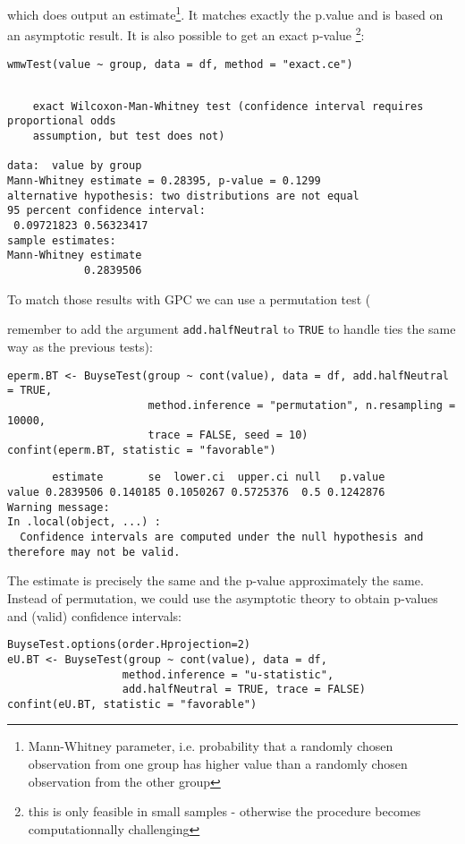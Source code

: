 \documentclass[12pt]{article}
\newcommand\Warning[1][3ex]{%
\renewcommand\stacktype{L}%
\scaleto{\stackon[1.3pt]{\color{red}$\triangle$}{\tiny\bfseries !}}{#1}%
\xspace
}
\begin{document}
which does output an estimate\footnote{Mann-Whitney parameter,
i.e. probability that a randomly chosen observation from one group has
higher value than a randomly chosen observation from the other
group}. It matches exactly the p.value and is based on an asymptotic
result. It is also possible to get an exact p-value \footnote{this is only
feasible in small samples - otherwise the procedure becomes
computationnally challenging}:
\lstset{language=r,label= ,caption= ,captionpos=b,numbers=none}
\begin{lstlisting}
wmwTest(value ~ group, data = df, method = "exact.ce")
\end{lstlisting}

\begin{verbatim}

	exact Wilcoxon-Man-Whitney test (confidence interval requires proportional odds
	assumption, but test does not)

data:  value by group
Mann-Whitney estimate = 0.28395, p-value = 0.1299
alternative hypothesis: two distributions are not equal
95 percent confidence interval:
 0.09721823 0.56323417
sample estimates:
Mann-Whitney estimate 
            0.2839506
\end{verbatim}

To match those results with GPC we can use a permutation test
(\Warning remember to add the argument \texttt{add.halfNeutral} to \texttt{TRUE} to
handle ties the same way as the previous tests):
\lstset{language=r,label= ,caption= ,captionpos=b,numbers=none}
\begin{lstlisting}
eperm.BT <- BuyseTest(group ~ cont(value), data = df, add.halfNeutral = TRUE,
                      method.inference = "permutation", n.resampling = 10000,
                      trace = FALSE, seed = 10)
confint(eperm.BT, statistic = "favorable")
\end{lstlisting}

\begin{verbatim}
       estimate       se  lower.ci  upper.ci null   p.value
value 0.2839506 0.140185 0.1050267 0.5725376  0.5 0.1242876
Warning message:
In .local(object, ...) :
  Confidence intervals are computed under the null hypothesis and therefore may not be valid.
\end{verbatim}


The estimate is precisely the same and the p-value approximately the
same. Instead of permutation, we could use the asymptotic theory to
obtain p-values and (valid) confidence intervals:
\lstset{language=r,label= ,caption= ,captionpos=b,numbers=none}
\begin{lstlisting}
BuyseTest.options(order.Hprojection=2)
eU.BT <- BuyseTest(group ~ cont(value), data = df,
                  method.inference = "u-statistic",
                  add.halfNeutral = TRUE, trace = FALSE)
confint(eU.BT, statistic = "favorable")
\end{lstlisting}
\end{document}
